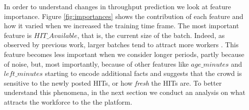 In order to understand  changes in throughput prediction we  look at  feature importance. Figure \ref{fig:importances} shows the  contribution of each feature and how it varied  when we increased the training time frame.
The most important feature is $HIT\_Available$, that is, the current size of the batch. Indeed, as observed by previous work, larger batches tend to attract more workers \cite{mturk,crowddb}. This feature becomes less important when we consider longer periods, partly because of  noise, but, most importantly, because of other features like $age\_minutes$ and $left\_minutes$ starting to encode additional facts and suggests that the crowd is sensitive to the newly posted HITs, or how \emph{fresh} the HITs are. To better understand this phenomena, in the next section we conduct an analysis on what attracts the workforce to the the platform.

